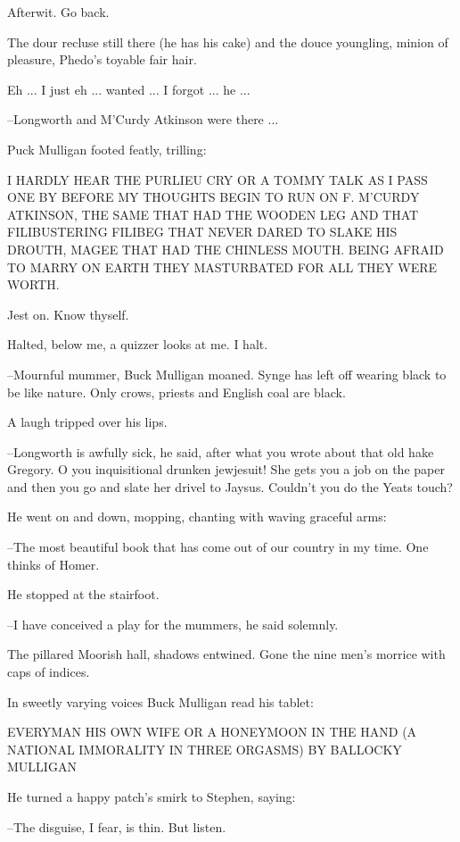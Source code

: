 Afterwit. Go back.

The dour recluse still there (he has his cake) and the douce youngling, minion of pleasure, Phedo's toyable fair hair.

Eh ... I just eh ... wanted ... I forgot ... he ...

--Longworth and M'Curdy Atkinson were there ...

Puck Mulligan footed featly, trilling:

    I HARDLY HEAR THE PURLIEU CRY
    OR A TOMMY TALK AS I PASS ONE BY
    BEFORE MY THOUGHTS BEGIN TO RUN
    ON F. M'CURDY ATKINSON,
    THE SAME THAT HAD THE WOODEN LEG
    AND THAT FILIBUSTERING FILIBEG
    THAT NEVER DARED TO SLAKE HIS DROUTH,
    MAGEE THAT HAD THE CHINLESS MOUTH.
    BEING AFRAID TO MARRY ON EARTH
    THEY MASTURBATED FOR ALL THEY WERE WORTH.

Jest on. Know thyself.

Halted, below me, a quizzer looks at me. I halt.

--Mournful mummer, Buck Mulligan moaned. Synge has left off wearing black to be like nature. Only crows, priests and English coal are black.

A laugh tripped over his lips.

--Longworth is awfully sick, he said, after what you wrote about that old hake Gregory. O you inquisitional drunken jewjesuit! She gets you a job on the paper and then you go and slate her drivel to Jaysus. Couldn't you do the Yeats touch?

He went on and down, mopping, chanting with waving graceful arms:

--The most beautiful book that has come out of our country in my time. One thinks of Homer.

He stopped at the stairfoot.

--I have conceived a play for the mummers, he said solemnly.

The pillared Moorish hall, shadows entwined. Gone the nine men's morrice with caps of indices.

In sweetly varying voices Buck Mulligan read his tablet:


        EVERYMAN HIS OWN WIFE
                OR
        A HONEYMOON IN THE HAND
    (A NATIONAL IMMORALITY IN THREE ORGASMS)
                BY
        BALLOCKY MULLIGAN


He turned a happy patch's smirk to Stephen, saying:

--The disguise, I fear, is thin. But listen.

